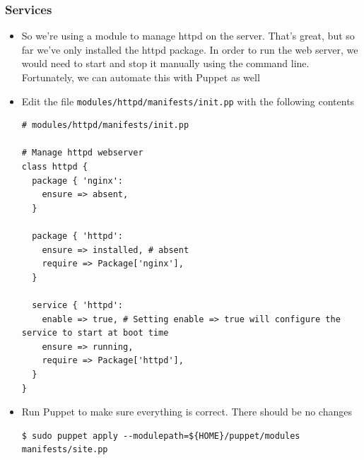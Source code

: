 \documentclass{beamer}
\begin{document}
\begin{frame}
\frametitle{Services}
\begin{itemize}
\item So we're using a module to manage httpd on the server. That's great, but so far we've only
installed the httpd package. In order to run the web server, we would need to start and stop
it manually using the command line. Fortunately, we can automate this with Puppet as well

\item Edit the file \texttt{modules/httpd/manifests/init.pp} with the following
contents

\lstset{language=shell}
\begin{lstlisting}[escapechar=&]
# modules/httpd/manifests/init.pp

# Manage httpd webserver
class httpd {
  package { 'nginx':
    ensure => absent,
  }

  package { 'httpd':
    ensure => installed, # absent
    require => Package['nginx'],
  }

  service { 'httpd':
    enable => true, # Setting enable => true will configure the service to start at boot time
    ensure => running,
    require => Package['httpd'],
  }
}
\end{lstlisting}

\item Run Puppet to make sure everything is correct. There should be no changes
\lstset{language=shell}
\begin{lstlisting}[escapechar=&]
$ sudo puppet apply --modulepath=${HOME}/puppet/modules manifests/site.pp
\end{lstlisting}
\end{itemize}

\end{frame}
\end{document}
